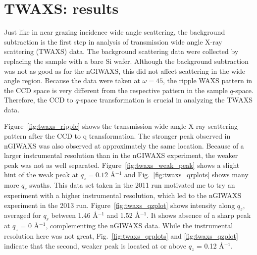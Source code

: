 \section{TWAXS: results}\label{sec:TWAXS_results}
Just like in near grazing incidence wide angle scattering, the background
subtraction is the first step in analysis of transmission wide angle X-ray 
scattering (TWAXS) data. The background scattering data were collected by replacing 
the sample with a bare Si wafer. Although the background subtraction was not 
as good as for the nGIWAXS, this did not affect scattering in the wide angle 
region. Because the data were taken at $\omega=45$\textdegree, the ripple
WAXS pattern in the CCD space is very different from the respective pattern
in the sample $q$-space. Therefore, the CCD to $q$-space transformation is crucial
in analyzing the TWAXS data. 

Figure~\ref{fig:twaxs_ripple} shows the transmission wide angle X-ray
scattering pattern after the CCD to q transformation. The stronger
peak observed in nGIWAXS was also observed at approximately the same location.
Because of a larger instrumental resolution than in the nGIWAXS experiment,
the weaker peak was not as well separated. Figure~\ref{fig:twaxs_weak_peak} shows
a slight hint of the weak peak at $q_z=0.12$ \AA$^{-1}$ and 
Fig.~\ref{fig:twaxs_qrplots} shows many more $q_r$ swaths. This
data set taken in the 2011 run motivated me to try an experiment
with a higher instrumental resolution, which led to the nGIWAXS experiment
in the 2013 run. Figure~\ref{fig:twaxs_qzplot} shows intensity along $q_z$,
averaged for $q_r$ between 1.46 \AA$^{-1}$ and 1.52 \AA$^{-1}$. It shows absence of
a sharp peak at $q_z$ = 0 \AA$^{-1}$, complementing the nGIWAXS data.
While the instrumental resolution here was not great, 
Fig.~\ref{fig:twaxs_qrplots} and \ref{fig:twaxs_qzplot} indicate
that the second, weaker peak is located at or above $q_z$ = 0.12 \AA$^{-1}$.


